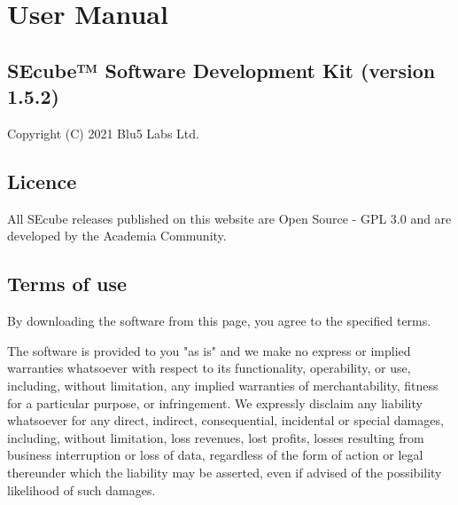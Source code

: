\chapter{User Manual}
\label{usermanual}



\section {SEcube™ Software Development Kit (version 1.5.2)}
Copyright (C) 2021 Blu5 Labs Ltd.

\section {Licence}
All SEcube releases published on this website are Open Source - GPL 3.0 and are developed by the Academia Community.

\section {Terms of use}
By downloading the software from this page, you agree to the specified terms.

The software is provided to you "as is" and we make no express or implied warranties whatsoever with respect to its functionality, operability, or use, including, without limitation, any implied warranties of merchantability, fitness for a particular purpose, or infringement. We expressly disclaim any liability whatsoever for any direct, indirect, consequential, incidental or special damages, including, without limitation, loss revenues, lost profits, losses resulting from business interruption or loss of data, regardless of the form of action or legal thereunder which the liability may be asserted, even if advised of the possibility likelihood of such damages.

